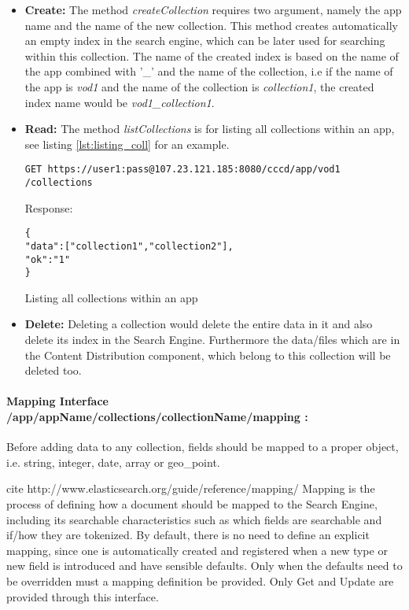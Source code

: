 \begin{itemize}
\item \textbf{Create:} The method \textit{createCollection} requires two argument, namely the app name and the name of the new collection. This method creates automatically an empty index in the search engine, which can be later used for searching within this collection. The name of the created index is based on the name of the app combined with '\_' and the name of the collection, i.e if the name of the app is \textit{vod1} and the name of the collection is \textit{collection1}, the created index name would be \textit{vod1\_collection1}.

\item \textbf{Read:} The method \textit{listCollections} is for listing all collections within an app, see listing \ref{lst:listing_coll} for an example.

\begin{code}
\begin{verbatim}
GET https://user1:pass@107.23.121.185:8080/cccd/app/vod1
/collections
\end{verbatim}
Response:
\begin{verbatim}
{
"data":["collection1","collection2"],
"ok":"1"
}
\end{verbatim}
\caption{Listing all collections within an app}
\label{lst:listing_coll}
\end{code}

\item \textbf{Delete:} Deleting a collection would delete the entire data in it and also delete its index in the Search Engine. Furthermore the data/files which are in the Content Distribution component, which belong to this collection will be deleted too.
\end{itemize}

\paragraph{Mapping Interface /app/{appName}/collections/{collectionName}/mapping :\label{sec:des_rest_api_mapping}} Before adding data to any collection, fields should be mapped to a proper object, i.e. string, integer, date, array or geo\_point. 

cite http://www.elasticsearch.org/guide/reference/mapping/
Mapping is the process of defining how a document should be mapped to the Search Engine, including its searchable characteristics such as which fields are searchable and if/how they are tokenized.  By default, there is no need to define an explicit mapping, since one is automatically created and registered when a new type or new field is introduced and have sensible defaults. Only when the defaults need to be overridden must a mapping definition be provided. Only Get and Update are provided through this interface.
 
